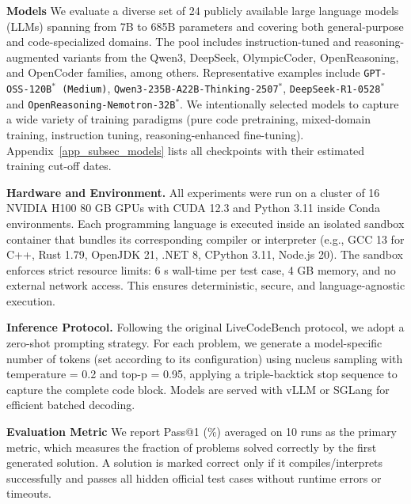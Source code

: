 \documentclass{llmxive}
\begin{document}
\textbf{Models} We evaluate a diverse set of 24 publicly available large language models (LLMs) spanning from 7B to 685B parameters and covering both general-purpose and code-specialized domains. The pool includes instruction-tuned and reasoning-augmented variants from the Qwen3, DeepSeek, OlympicCoder, OpenReasoning, and OpenCoder families, among others.
Representative examples include \texttt{GPT-OSS-120B$^*$ (Medium)}, \texttt{Qwen3-235B-A22B-Thinking-2507$^*$}, \texttt{DeepSeek-R1-0528$^*$} and \texttt{OpenReasoning-Nemotron-32B$^*$}.
We intentionally selected models to capture a wide variety of training paradigms (pure code pretraining, mixed-domain training, instruction tuning, reasoning-enhanced fine-tuning).
Appendix~\ref{app_subsec_models} lists all checkpoints with their estimated training cut-off dates.

\textbf{Hardware and Environment.}
All experiments were run on a cluster of 16 NVIDIA H100 80 GB GPUs with CUDA 12.3 and Python 3.11 inside Conda environments.
Each programming language is executed inside an isolated sandbox container that bundles its corresponding compiler or interpreter (e.g., GCC 13 for C++, Rust 1.79, OpenJDK 21, .NET 8, CPython 3.11, Node.js 20).
The sandbox enforces strict resource limits: 6 s wall-time per test case, 4 GB memory, and no external network access.
This ensures deterministic, secure, and language-agnostic execution.

\textbf{Inference Protocol.}
Following the original LiveCodeBench protocol, we adopt a zero-shot prompting strategy.
For each problem, we generate a model-specific number of tokens (set according to its configuration) using nucleus sampling with temperature = 0.2 and top-p = 0.95, applying a triple-backtick stop sequence to capture the complete code block.
Models are served with vLLM \citep{kwon2023efficient} or SGLang \citep{zheng2024sglang} for efficient batched decoding.

\textbf{Evaluation Metric}
We report Pass@1 (\%) averaged on 10 runs as the primary metric, which measures the fraction of problems solved correctly by the first generated solution. A solution is marked correct only if it compiles/interprets successfully and passes all hidden official test cases without runtime errors or timeouts.
\end{document}
